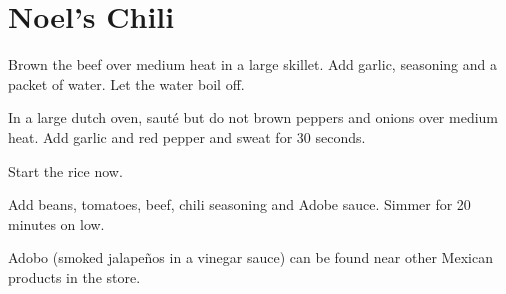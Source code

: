 

\section{Noel's Chili}
\begin{recipe}



Brown the beef over medium heat in a large skillet. Add garlic, seasoning and a packet of water.  Let the water boil off.


In a large dutch oven, sauté but do not brown peppers and onions over medium heat. Add garlic and red pepper and sweat for 30 seconds.


Start the rice now.


Add beans, tomatoes, beef, chili seasoning and Adobe sauce. Simmer for 20 minutes on low.

Adobo (smoked jalapeños in a vinegar sauce) can be found near other Mexican products in the store.



\end{recipe}
